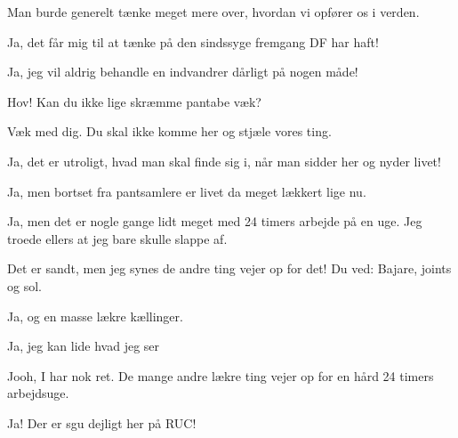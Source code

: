 \documentclass[a4paper,11pt]{article}
\begin{document}
\begin{sketch}
  Man burde generelt tænke meget mere over, hvordan vi opfører os i verden.

 Ja, det får mig til at tænke på den sindssyge fremgang DF har haft!

 Ja, jeg vil aldrig behandle en indvandrer dårligt på nogen måde!


 Hov! Kan du ikke lige skræmme pantabe væk?


 Væk med dig. Du skal ikke komme her og stjæle vores ting.

 Ja, det er utroligt, hvad man skal finde sig i,  når man sidder her og nyder livet!


 Ja, men bortset fra pantsamlere er livet da meget lækkert lige nu.

 Ja, men det er nogle gange lidt meget med 24 timers arbejde på en uge. Jeg troede ellers at jeg bare skulle slappe af.

 Det er sandt, men jeg synes de andre ting vejer op for det! Du ved: Bajare, joints og sol.

 Ja, og en masse lækre kællinger. 

 Ja, jeg kan lide hvad jeg ser 

 Jooh, I har nok ret. De mange andre lækre ting vejer op for en hård 24 timers arbejdsuge.

  Ja! Der er sgu dejligt her på RUC!






\end{sketch}
\end{document}

